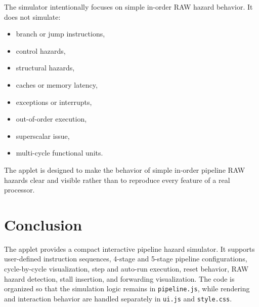 \documentclass[11pt,a4paper]{article}
\begin{document}
The simulator intentionally focuses on simple in-order RAW hazard behavior. It does not simulate:

\begin{itemize}[leftmargin=*]
    \item branch or jump instructions,
    \item control hazards,
    \item structural hazards,
    \item caches or memory latency,
    \item exceptions or interrupts,
    \item out-of-order execution,
    \item superscalar issue,
    \item multi-cycle functional units.
\end{itemize}

The applet is designed to make the behavior of simple in-order pipeline RAW hazards clear and visible rather than to reproduce every feature of a real processor.

\section{Conclusion}

The applet provides a compact interactive pipeline hazard simulator. It supports user-defined instruction sequences, 4-stage and 5-stage pipeline configurations, cycle-by-cycle visualization, step and auto-run execution, reset behavior, RAW hazard detection, stall insertion, and forwarding visualization. The code is organized so that the simulation logic remains in \texttt{pipeline.js}, while rendering and interaction behavior are handled separately in \texttt{ui.js} and \texttt{style.css}.
\end{document}
